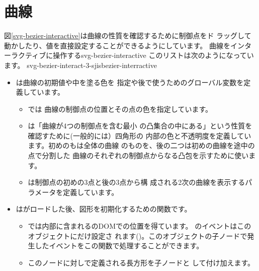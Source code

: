 \iffalse
\chapter{\Bezier 曲線}
図\ref{svg-bezier-interactive}は\Bezier 曲線の性質を確認するために制御点をド
ラッグして動かしたり、値を直接設定することができるようにしています。
{\Bezier 曲線をインターラクティブに操作する}{svg-bezier-interactive}
このリストは次のようになっています。
  {svg-bezier-interact-3-sjis}{bezier-interractive}
\begin{itemize}
 \item {}は\Bezier 曲線の初期値や中を塗る色を
       指定や後で使うためのグローバル変数を定義しています。
\begin{itemize}
 \item {}では
       \Bezier 曲線の制御点の位置とその点の色を指定しています。
 \item {}は「\Bezier 曲線が4つの制御点を含む最小
       の凸集合の中にある」という性質を確認すために(一般的には）四角形の
       内部の色と不透明度を定義しています。初めのもは全体の\Bezier 曲線
       のものを、後の二つは初めの\Bezier 曲線を途中の点で分割した\Bezier
       曲線のそれぞれの制御点からなる凸包を示すために使います。
 \item {}は制御点の初めの3点と後の3点から構
       成される2次の\Bezier 曲線を表示するパラメータを定義しています。
\end{itemize}
 \item {}は\SVG がロードした後、図形を初期化するための関数です。
\begin{itemize}
 \item {}では内部に含まれる\SVG のDOMでの位置を得ています。
       のイベントはこのオブジェクトにだけ設定さ
       れます()。このオブジェクトの子ノードで発
       生したイベントをこの関数で処理することができます。
 \item このノードに対しで定義される長方形を子ノードと
       して付け加えます。


\end{itemize}
\end{itemize}
